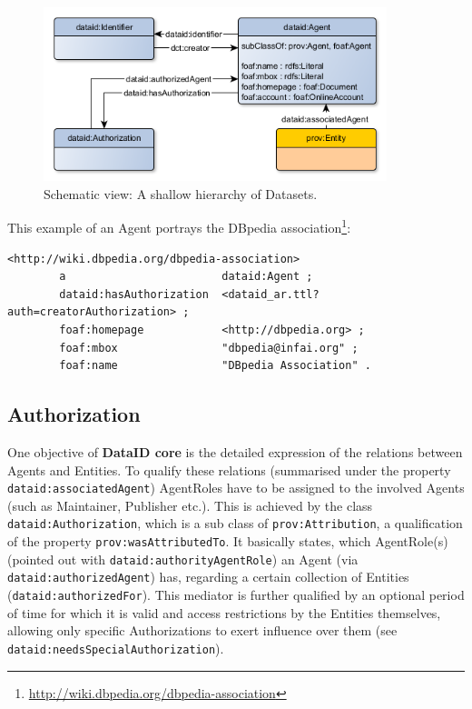 \documentclass[a4paper,english,twoside,BCOR1.5cm,headsepline,DIV12,appendixprefix,final,12pt]{scrbook}
\newcommand{\core}{{\ttfamily\bfseries DataID core}\xspace}
\newcommand{\prop}[1]{{{\texttt{#1}}}}
\newcommand\footnoteurl[1]{\footnote{\scriptsize\url{#1}}}
\begin{document}
\begin{figure}[!htbp]
\centering
  \includegraphics[width=10cm]{images/ClassAgent.png}
  \caption{Schematic view: A shallow hierarchy of Datasets.}
  \label{fig:example}
\end{figure}

This example of an Agent portrays the DBpedia association\footnoteurl{http://wiki.dbpedia.org/dbpedia-association}:
\\
\begin{lstlisting}[language=ttl, captionpos=b,caption=Example of an organisation,label=lst:coresuperset,linewidth=\columnwidth,breaklines=true]
<http://wiki.dbpedia.org/dbpedia-association>
        a                        dataid:Agent ;
        dataid:hasAuthorization  <dataid_ar.ttl?auth=creatorAuthorization> ; 
        foaf:homepage            <http://dbpedia.org> ;
        foaf:mbox                "dbpedia@infai.org" ;                                                        
        foaf:name                "DBpedia Association" .
\end{lstlisting}

\subsection{Authorization} 
\label{sec:coreauthorization}
One objective of \core is the detailed expression of the relations between Agents and Entities. To qualify these relations (summarised under the property \prop{dataid:associatedAgent}) AgentRoles have to be assigned to the involved Agents (such as Maintainer, Publisher etc.). This is achieved by the class \prop{dataid:Authorization}, which is a sub class of \prop{prov:Attribution}, a qualification of the property \prop{prov:wasAttributedTo}. It basically states, which AgentRole(s) (pointed out with \prop{dataid:authorityAgentRole}) an Agent (via \prop{dataid:authorizedAgent}) has, regarding a certain collection of Entities (\prop{dataid:authorizedFor}). This mediator is further qualified by an optional period of time for which it is valid and access restrictions by the Entities themselves, allowing only specific Authorizations to exert influence over them (see \prop{dataid:needsSpecialAuthorization}). 
\end{document}
